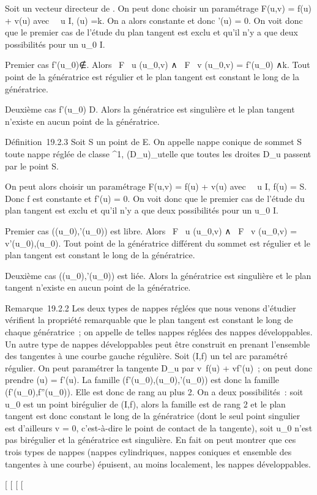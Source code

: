 \documentclass[]{article}
\begin{document}
Soit \veck un vecteur directeur de
\vecD. On peut donc choisir un paramétrage F(u,v) =
f(u) + v\vecg(u) avec \forall~~u \in
I, \vecg(u) =\vec k. On a alors
\vecg constante et donc \vecg'(u)
= 0. On voit donc que le premier cas de l'étude du plan tangent est
exclu et qu'il n'y a que deux possibilités pour un u\_0 \in I.

Premier cas
f'(u\_0)∉\vecD.
Alors  \partial~F \over \partial~u (u\_0,v) ∧ \partial~F
\over \partial~v (u\_0,v) = f'(u\_0)
∧\vec k. Tout point de la génératrice est régulier et
le plan tangent est constant le long de la génératrice.

Deuxième cas f'(u\_0) \in\vec D. Alors la
génératrice est singulière et le plan tangent n'existe en aucun point de
la génératrice.

Définition~19.2.3 Soit S un point de E. On appelle nappe conique de
sommet S toute nappe réglée de classe ^1,
(D\_u)\_u\inI telle que toutes les droites D\_u
passent par le point S.

On peut alors choisir un paramétrage F(u,v) = f(u) +
v\vecg(u) avec \forall~~u \in I, f(u)
= S. Donc f est constante et f'(u) = 0. On voit donc que le premier cas
de l'étude du plan tangent est exclu et qu'il n'y a que deux
possibilités pour un u\_0 \in I.

Premier cas
(\vecg(u\_0),\vecg'(u\_0))
est libre. Alors  \partial~F \over \partial~u (u\_0,v) ∧ \partial~F
\over \partial~v (u\_0,v) =
v\vecg'(u\_0),\vecg(u\_0).
Tout point de la génératrice différent du sommet est régulier et le plan
tangent est constant le long de la génératrice.

Deuxième cas
(\vecg(u\_0),\vecg'(u\_0))
est liée. Alors la génératrice est singulière et le plan tangent
n'existe en aucun point de la génératrice.

Remarque~19.2.2 Les deux types de nappes réglées que nous venons
d'étudier vérifient la propriété remarquable que le plan tangent est
constant le long de chaque génératrice~; on appelle de telles nappes
réglées des nappes développables. Un autre type de nappes développables
peut être construit en prenant l'ensemble des tangentes à une courbe
gauche régulière. Soit (I,f) un tel arc paramétré régulier. On peut
paramétrer la tangente D\_u par
v\mapsto~f(u) + vf'(u)~; on peut donc prendre
\vecg(u) = f'(u). La famille
(f'(u\_0),\vecg(u\_0),\vecg'(u\_0))
est donc la famille (f'(u\_0),f''(u\_0)). Elle est donc
de rang au plus 2. On a deux possibilités~: soit u\_0 est un
point birégulier de (I,f), alors la famille est de rang 2 et le plan
tangent est donc constant le long de la génératrice (dont le seul point
singulier est d'ailleurs v = 0, c'est-à-dire le point de contact de la
tangente), soit u\_0 n'est pas birégulier et la génératrice est
singulière. En fait on peut montrer que ces trois types de nappes
(nappes cylindriques, nappes coniques et ensemble des tangentes à une
courbe) épuisent, au moins localement, les nappes développables.

{[}
{[}
{[}
{[}
\end{document}
